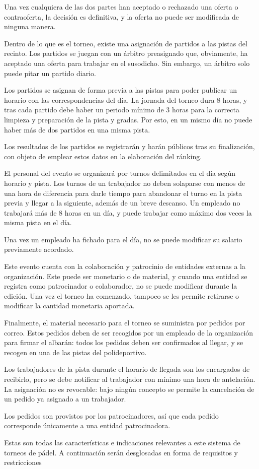 Una vez cualquiera de las dos partes han aceptado o rechazado una oferta o contraoferta, la decisión es definitiva, y la oferta no puede ser modificada de ninguna manera.


Dentro de lo que es el torneo, existe una asignación de partidos a las pistas del recinto. Los partidos se juegan con un árbitro preasignado que, obviamente, ha aceptado una oferta para trabajar en el susodicho. Sin embargo, un árbitro solo puede pitar un partido diario.

Los partidos se asignan de forma previa a las pistas para poder publicar un horario con las correspondencias del día. La jornada del torneo dura 8 horas, y tras cada partido debe haber un periodo mínimo de 3 horas para la correcta limpieza y preparación de la pista y gradas. Por esto, en un mismo día no puede haber más de dos partidos en una misma pista.

Los resultados de los partidos se registrarán y harán públicos tras su finalización, con objeto de emplear estos datos en la elaboración del ránking.


El personal del evento se organizará por turnos delimitados en el día según horario y pista. Los turnos de un trabajador no deben solaparse con menos de una hora de diferencia para darle tiempo para abandonar el turno en la pista previa y llegar a la siguiente, además de un breve descanso. Un empleado no trabajará más de 8 horas en un día, y puede trabajar como máximo dos veces la misma pista en el día.

Una vez un empleado ha fichado para el día, no se puede modificar su salario previamente acordado.


Este evento cuenta con la colaboración y patrocinio de entidades externas a la organización. Este puede ser monetario o de material, y cuando una entidad se registra como patrocinador o colaborador, no se puede modificar durante la edición. Una vez el torneo ha comenzado, tampoco se les permite retirarse o modificar la cantidad monetaria aportada.


Finalmente, el material necesario para el torneo se suministra por pedidos por correo. Estos pedidos deben de ser recogidos por un empleado de la organización para firmar el albarán: todos los pedidos deben ser confirmados al llegar, y se recogen en una de las pistas del polideportivo. 

Los trabajadores de la pista durante el horario de llegada son los encargados de recibirlo, pero se debe notificar al trabajador con mínimo una hora de antelación. La asignación no es revocable: bajo ningún concepto se permite la cancelación de un pedido ya asignado a un trabajador.

Los pedidos son provistos por los patrocinadores, así que cada pedido corresponde únicamente a una entidad patrocinadora.


Estas son todas las características e indicaciones relevantes a este sistema de torneos de pádel. A continuación serán desglosadas en forma de requisitos y restricciones



